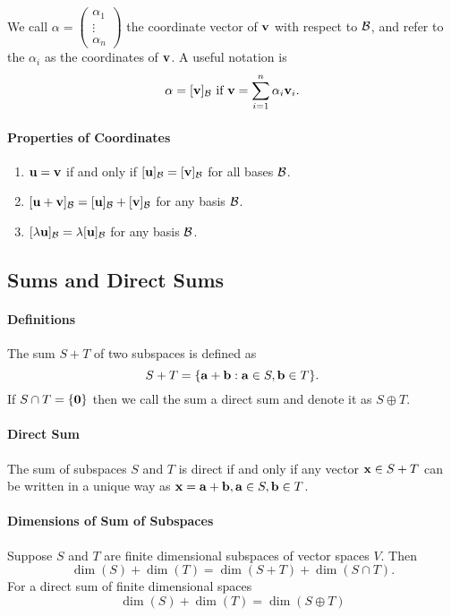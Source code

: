 We call \(\alpha = \begin{pmatrix}
    \alpha_1 \\
    \vdots \\
    \alpha_n
\end{pmatrix}\) the coordinate vector of \(\mathbf{v}\) with respect to \(\mathcal{B}\), and refer to the \(\alpha_i\) as the coordinates of \(\mathbf{v}\). A useful notation is 
\[\mathbf{\alpha} = [\mathbf{v}]_{\mathcal{B}} \text{ if } \mathbf{v} = \sum_{i=1}^n \alpha_i\mathbf{v}_i.\]

\paragraph{Properties of Coordinates}
\begin{enumerate}
    \item \(\mathbf{u} = \mathbf{v}\) if and only if \([\mathbf{u}]_{\mathcal{B}} = [\mathbf{v}]_{\mathcal{B}}\) for all bases \(\mathcal{B}\).
    \item \([\mathbf{u} + \mathbf{v}]_{\mathcal{B}} = [\mathbf{u}]_{\mathcal{B}} + [\mathbf{v}]_{\mathcal{B}}\) for any basis \(\mathcal{B}\).
    \item \([\lambda\mathbf{u}]_{\mathcal{B}} = \lambda[\mathbf{u}]_{\mathcal{B}}\) for any basis \(\mathcal{B}\).
\end{enumerate}

\subsection{Sums and Direct Sums}
\paragraph{Definitions}
The sum \(S + T\) of two subspaces is defined as 
\[S + T = \{\mathbf{a} + \mathbf{b} : \mathbf{a} \in S, \mathbf{b} \in T \}.\]
If \(S \cap T = \{\mathbf{0}\}\) then we call the sum a direct sum and denote it as \(S \oplus T\). 

\paragraph{Direct Sum}
The sum of subspaces \(S\) and \(T\) is direct if and only if any vector \(\mathbf{x} \in S + T\) can be written in a unique way as \(\mathbf{x} = \mathbf{a} + \mathbf{b}, \mathbf{a} \in S, \mathbf{b} \in T\).

\paragraph{Dimensions of Sum of Subspaces}
Suppose \(S\) and \(T\) are finite dimensional subspaces of vector spaces \(V\). Then 
\[\dim(S) + \dim(T) = \dim(S + T) + \dim(S \cap T).\]
For a direct sum of finite dimensional spaces
\[\dim(S) + \dim(T) = \dim(S \oplus T)\]

